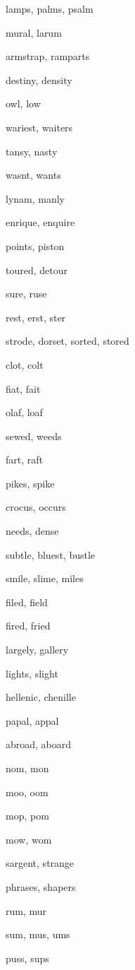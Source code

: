     \item lamps, palms, psalm
    \item mural, larum
    \item armstrap, ramparts
    \item destiny, density
    \item owl, low
    \item wariest, waiters
    \item tansy, nasty
    \item wasnt, wants
    \item lynam, manly
    \item enrique, enquire
    \item points, piston
    \item toured, detour
    \item sure, ruse
    \item rest, erst, ster
    \item strode, dorset, sorted, stored
    \item clot, colt
    \item fiat, fait
    \item olaf, loaf
    \item sewed, weeds
    \item fart, raft
    \item pikes, spike
    \item crocus, occurs
    \item needs, dense
    \item subtle, bluest, bustle
    \item smile, slime, miles
    \item filed, field
    \item fired, fried
    \item largely, gallery
    \item lights, slight
    \item hellenic, chenille
    \item papal, appal
    \item abroad, aboard
    \item nom, mon
    \item moo, oom
    \item mop, pom
    \item mow, wom
    \item sargent, strange
    \item phrases, shapers
    \item rum, mur
    \item sum, mus, ums
    \item puss, sups
